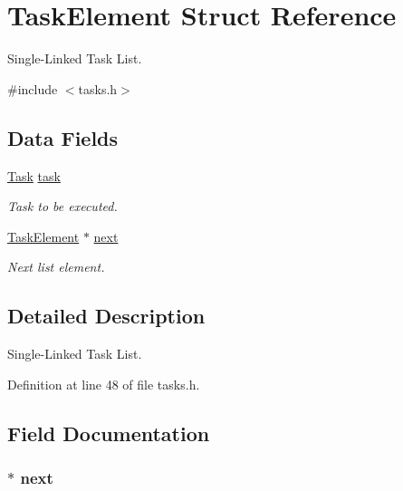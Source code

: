 \hypertarget{struct_task_element}{\section{Task\-Element Struct Reference}
\label{struct_task_element}
}


Single-\/\-Linked Task List.  




{\ttfamily \#include $<$tasks.\-h$>$}

\subsection*{Data Fields}
\begin{DoxyCompactItemize}
\item 
\hyperlink{group__task_gaa9c5b8d3ac838189ed335dbe4ec9fa6b}{Task} \hyperlink{struct_task_element_a8bcc572b9d73774627be66dd46aa61a8}{task}
\begin{DoxyCompactList}\small\item\em Task to be executed. \end{DoxyCompactList}\item 
\hyperlink{struct_task_element}{Task\-Element} $\ast$ \hyperlink{struct_task_element_ac0faa835255f5aba0bdb6fe9083d9d7d}{next}
\begin{DoxyCompactList}\small\item\em Next list element. \end{DoxyCompactList}\end{DoxyCompactItemize}


\subsection{Detailed Description}
Single-\/\-Linked Task List. 



Definition at line 48 of file tasks.\-h.



\subsection{Field Documentation}
\hypertarget{struct_task_element_ac0faa835255f5aba0bdb6fe9083d9d7d}{
\subsubsection[{next}]{$\ast$ next}}\label{struct_task_element_ac0faa835255f5aba0bdb6fe9083d9d7d}



